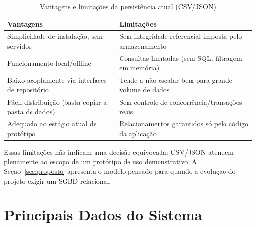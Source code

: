 \begin{table}[htbp]
  \centering
  \caption{Vantagens e limitações da persistência atual (CSV/JSON)}
  \label{tab:vantagens}
  \small
  \renewcommand{\arraystretch}{1.25}
  \begin{tabular}{p{6.6cm}p{6.6cm}}
    \hline
    \textbf{Vantagens} & \textbf{Limitações} \\
    \hline
    Simplicidade de instalação, sem servidor & Sem integridade referencial imposta pelo
    armazenamento \\
    Funcionamento local/offline & Consultas limitadas (sem SQL; filtragem em memória) \\
    Baixo acoplamento via interfaces de repositório & Tende a não escalar bem para grande
    volume de dados \\
    Fácil distribuição (basta copiar a pasta de dados) & Sem controle de concorrência/transações
    reais \\
    Adequado ao estágio atual de protótipo & Relacionamentos garantidos só pelo código da
    aplicação \\
    \hline
  \end{tabular}
\end{table}

Essas limitações não indicam uma decisão equivocada: CSV/JSON atendem plenamente ao escopo de um
protótipo de uso demonstrativo. A Seção~\ref{sec:proposto} apresenta o modelo pensado para quando
a evolução do projeto exigir um SGBD relacional.

\section{Principais Dados do Sistema}

